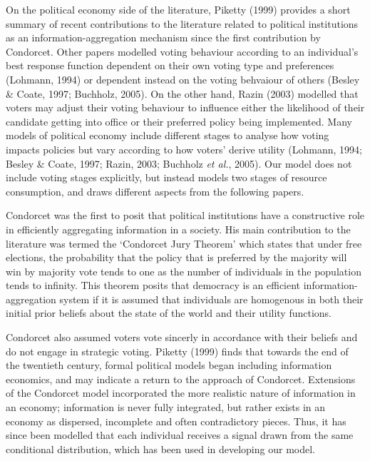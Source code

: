 \documentclass[11pt,preprint, authoryear]{elsarticle}
\numberwithin{equation}{section}
\numberwithin{figure}{section}
\numberwithin{table}{section}
\begin{document}
On the political economy side of the literature, Piketty (1999) provides
a short summary of recent contributions to the literature related to
political institutions as an information-aggregation mechanism since the
first contribution by Condorcet. Other papers modelled voting behaviour
according to an individual's best response function dependent on their
own voting type and preferences (Lohmann, 1994) or dependent instead on
the voting behvaiour of others (Besley \& Coate, 1997; Buchholz, 2005).
On the other hand, Razin (2003) modelled that voters may adjust their
voting behaviour to influence either the likelihood of their candidate
getting into office or their preferred policy being implemented. Many
models of political economy include different stages to analyse how
voting impacts policies but vary according to how voters' derive utility
(Lohmann, 1994; Besley \& Coate, 1997; Razin, 2003; Buchholz \emph{et
al.}, 2005). Our model does not include voting stages explicitly, but
instead models two stages of resource consumption, and draws different
aspects from the following papers.

Condorcet was the first to posit that political institutions have a
constructive role in efficiently aggregating information in a society.
His main contribution to the literature was termed the `Condorcet Jury
Theorem' which states that under free elections, the probability that
the policy that is preferred by the majority will win by majority vote
tends to one as the number of individuals in the population tends to
infinity. This theorem posits that democracy is an efficient
information-aggregation system if it is assumed that individuals are
homogenous in both their initial prior beliefs about the state of the
world and their utility functions.

Condorcet also assumed voters vote sincerly in accordance with their
beliefs and do not engage in strategic voting. Piketty (1999) finds that
towards the end of the twentieth century, formal political models began
including information economics, and may indicate a return to the
approach of Condorcet. Extensions of the Condorcet model incorporated
the more realistic nature of information in an economy; information is
never fully integrated, but rather exists in an economy as dispersed,
incomplete and often contradictory pieces. Thus, it has since been
modelled that each individual receives a signal drawn from the same
conditional distribution, which has been used in developing our model.
\end{document}
